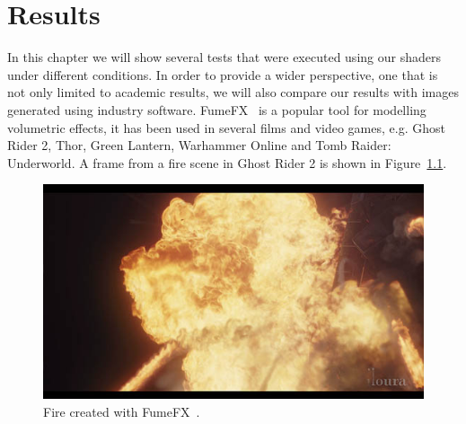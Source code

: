 \chapter{Results}
\label{ch:results}

In this chapter we will show several tests that were executed using our shaders under different conditions.
In order to provide a wider perspective, one that is not only limited to academic results, we will also compare our results with images generated using industry software.
FumeFX~\cite{FumeFX} is a popular tool for modelling volumetric effects, it has been used in several films and video games, e.g. Ghost Rider 2, Thor, Green Lantern, Warhammer Online and Tomb Raider: Underworld.
A frame from a fire scene in Ghost Rider 2 is shown in Figure~\ref{fig:fumefx}.

\begin{figure}[htbp]
	\centering
	\includegraphics[width=\textwidth]{img/fumefx}
	\caption{Fire created with FumeFX~\cite{FumeFX}.}
	\label{fig:fumefx}
\end{figure}


